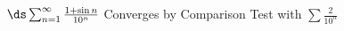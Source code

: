 {$\ds \sum_{n=1}^\infty \frac{1+\sin n}{10^n}$}
{Converges by Comparison Test with $\sum \frac{2}{10^n}$}